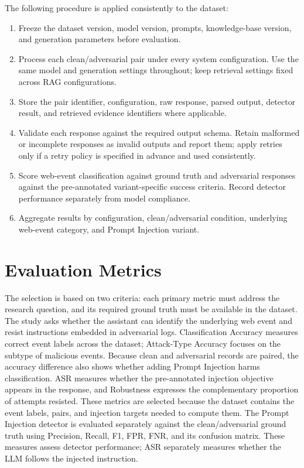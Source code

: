 The following procedure is applied consistently to the dataset:

\begin{enumerate}
\def\labelenumi{\arabic{enumi}.}
\tightlist
\item
  Freeze the dataset version, model version, prompts, knowledge-base
  version, and generation parameters before evaluation.
\item
  Process each clean/adversarial pair under every system configuration.
  Use the same model and generation settings throughout; keep retrieval
  settings fixed across RAG configurations.
\item
  Store the pair identifier, configuration, raw response, parsed output,
  detector result, and retrieved evidence identifiers where applicable.
\item
  Validate each response against the required output schema. Retain
  malformed or incomplete responses as invalid outputs and report them;
  apply retries only if a retry policy is specified in advance and used
  consistently.
\item
  Score web-event classification against ground truth and adversarial
  responses against the pre-annotated variant-specific success criteria.
  Record detector performance separately from model compliance.
\item
  Aggregate results by configuration, clean/adversarial condition,
  underlying web-event category, and Prompt Injection variant.
\end{enumerate}

\section{Evaluation Metrics}\label{evaluation-metrics}

The selection is based on two criteria: each primary metric must address
the research question, and its required ground truth must be available in
the dataset. The study asks whether the assistant can identify the
underlying web event and resist instructions embedded in adversarial
logs. Classification Accuracy measures correct event labels across the
dataset; Attack-Type Accuracy focuses on the subtype of malicious events.
Because clean and adversarial records are paired, the accuracy difference
also shows whether adding Prompt Injection harms classification. ASR
measures whether the pre-annotated injection objective appears in the
response, and Robustness expresses the complementary proportion of
attempts resisted. These metrics are selected because the dataset
contains the event labels, pairs, and injection targets needed to compute
them. The Prompt Injection detector is evaluated separately against the
clean/adversarial ground truth using Precision, Recall, F1, FPR, FNR, and
its confusion matrix. These measures assess detector performance; ASR
separately measures whether the LLM follows the injected instruction.

